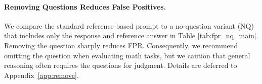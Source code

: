 
\paragraph{Removing Questions Reduces False Positives. }
We compare the standard reference-based prompt to a no-question variant (NQ) that includes only the response and reference answer in Table \ref{tab:fpr_nq_main}. Removing the question sharply reduces FPR. Consequently, we recommend omitting the question when evaluating math tasks, but we caution that general reasoning often requires the questions for judgment. Details are deferred to Appendix~\ref{app:remove}.


